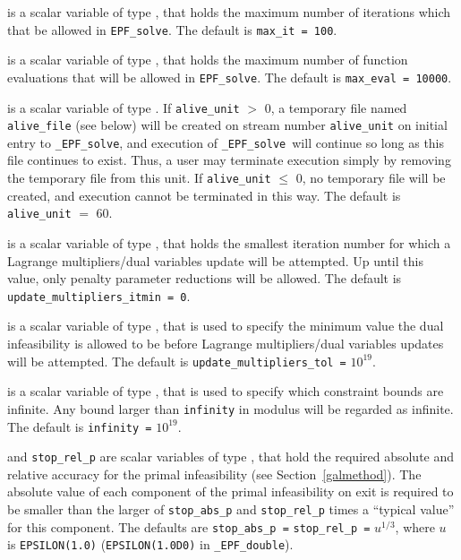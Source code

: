 \documentclass{galahad}
\newcommand{\packagename}{EPF}
\newcommand{\fullpackagename}{\libraryname\_\packagename}
\newcommand{\solver}{{\tt \fullpackagename\_solve}}
\begin{document}
\begin{description}
 is a scalar variable of type \integer, that holds the
maximum number of iterations which that be allowed in {\tt \packagename\_solve}.
The default is {\tt max\_it = 100}.

 is a scalar variable of type \integer, that holds the
maximum number of function evaluations that will be allowed in 
{\tt \packagename\_solve}.
The default is {\tt max\_eval = 10000}.

 is a scalar variable of type \integer.
If {\tt alive\_unit} $>$ 0, a temporary file named {\tt alive\_file} (see below)
will be created on stream number {\tt alive\_unit} on initial entry to
\solver, and execution of \solver\ will continue so
long as this file continues to exist. Thus, a user may terminate execution
simply by removing the temporary file from this unit.
If {\tt alive\_unit} $\leq$ 0, no temporary file will be created, and
execution cannot be terminated in this way.
The default is {\tt alive\_unit} $=$ 60.

 is a scalar variable of type \integer, 
that holds the smallest iteration number for which a 
Lagrange multipliers/dual variables update will be attempted.
Up until this value, only penalty parameter reductions will be allowed.
The default is {\tt update\_multipliers\_itmin = 0}.

 is a scalar variable of type \realdp, that is 
used to specify the minimum value the dual infeasibility is allowed to be
before Lagrange multipliers/dual variables updates will be attempted.
The default is {\tt update\_multipliers\_tol =} $10^{19}$.

 is a scalar variable of type \realdp, that is used to
specify which constraint bounds are infinite.
Any bound larger than {\tt infinity} in modulus will be regarded as infinite.
The default is {\tt infinity =} $10^{19}$.

 and {\tt stop\_rel\_p}
are scalar variables of type \realdp, that hold the
required absolute and relative accuracy for the primal infeasibility
(see Section~\ref{galmethod}).
The absolute value of each component of the primal infeasibility
on exit is required to be smaller than the larger of {\tt stop\_abs\_p} and
{\tt stop\_rel\_p} times a ``typical value'' for this component.
The defaults are {\tt stop\_abs\_p =} {\tt stop\_rel\_p =} $u^{1/3}$,
where $u$ is {\tt EPSILON(1.0)} ({\tt EPSILON(1.0D0)} in
{\tt \fullpackagename\_double}).


\end{description}
\end{document}
